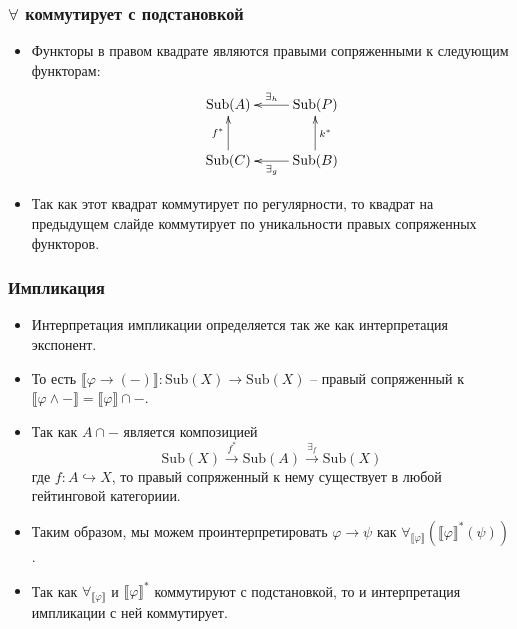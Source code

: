 \documentclass{beamer}
\theoremstyle{definition}
\renewcommand{\ll}{\llbracket}
\newcommand{\rr}{\rrbracket}
\newcommand{\fs}[1]{\mathrm{#1}}
\newcommand{\Sub}{\fs{Sub}}
\begin{document}
\begin{frame}
\frametitle{$\forall$ коммутирует с подстановкой}
\begin{itemize}
\item Функторы в правом квадрате являются правыми сопряженными к следующим функторам:
\[ \xymatrix{ \Sub(A)              & \Sub(P) \ar[l]_{\exists_h} \\
              \Sub(C) \ar[u]^{f^*} & \Sub(B) \ar[l]^{\exists_g} \ar[u]_{k^*} 
            } \]
\item Так как этот квадрат коммутирует по регулярности, то квадрат на предыдущем слайде коммутирует по уникальности правых сопряженных функторов.
\end{itemize}
\end{frame}

\begin{frame}
\frametitle{Импликация}
\begin{itemize}
\item Интерпретация импликации определяется так же как интерпретация экспонент.
\item То есть $\ll \varphi \to (-) \rr : \Sub(X) \to \Sub(X)$ -- правый сопряженный к $\ll \varphi \land - \rr = \ll \varphi \rr \cap -$.
\item Так как $A \cap -$ является композицией
\[ \Sub(X) \xrightarrow{f^*} \Sub(A) \xrightarrow{\exists_f} \Sub(X) \]
где $f : A \hookrightarrow X$, то правый сопряженный к нему существует в любой гейтинговой категориии.
\item Таким образом, мы можем проинтерпретировать $\varphi \to \psi$ как $\forall_{\ll \varphi \rr} (\ll \varphi \rr^*(\psi))$.
\item Так как $\forall_{\ll \varphi \rr}$ и $\ll \varphi \rr^*$ коммутируют с подстановкой, то и интерпретация импликации с ней коммутирует.
\end{itemize}
\end{frame}
\end{document}
